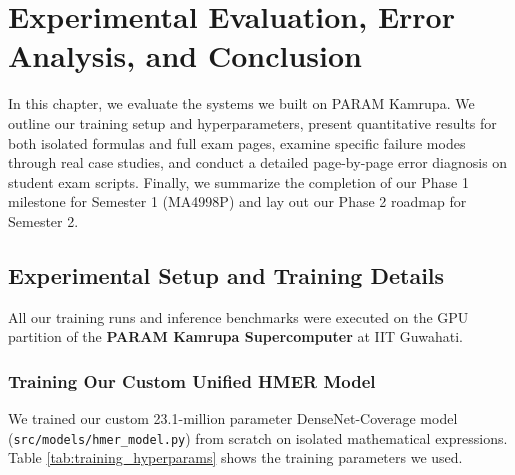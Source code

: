\chapter{Experimental Evaluation, Error Analysis, and Conclusion}
\label{ch:experiments}

In this chapter, we evaluate the systems we built on PARAM Kamrupa. We outline our training setup and hyperparameters, present quantitative results for both isolated formulas and full exam pages, examine specific failure modes through real case studies, and conduct a detailed page-by-page error diagnosis on student exam scripts. Finally, we summarize the completion of our Phase 1 milestone for Semester 1 (MA4998P) and lay out our Phase 2 roadmap for Semester 2.

\section{Experimental Setup and Training Details}
\label{sec:experimental_setup}

All our training runs and inference benchmarks were executed on the GPU partition of the \textbf{PARAM Kamrupa Supercomputer} at IIT Guwahati.

\subsection{Training Our Custom Unified HMER Model}
We trained our custom 23.1-million parameter DenseNet-Coverage model (\texttt{src/models/hmer\_model.py}) from scratch on isolated mathematical expressions. Table \ref{tab:training_hyperparams} shows the training parameters we used.

